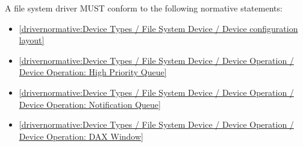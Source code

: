 \label{sec:Conformance / Driver Conformance / File System Driver Conformance}

A file system driver MUST conform to the following normative statements:

\begin{itemize}
\item \ref{drivernormative:Device Types / File System Device / Device configuration layout}
\item \ref{drivernormative:Device Types / File System Device / Device Operation / Device Operation: High Priority Queue}
\item \ref{drivernormative:Device Types / File System Device / Device Operation / Device Operation: Notification Queue}
\item \ref{drivernormative:Device Types / File System Device / Device Operation / Device Operation: DAX Window}
\end{itemize}
